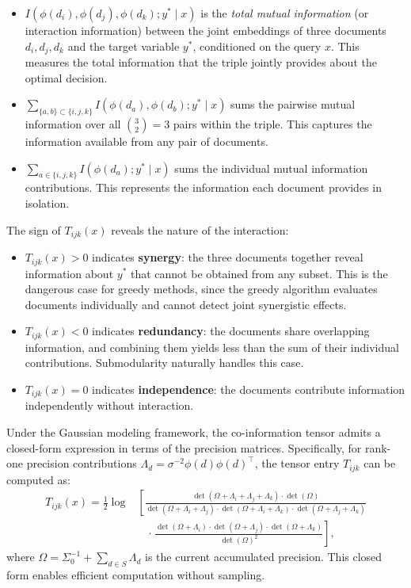 \documentclass[12pt,a4paper,oneside]{report}
\theoremstyle{definition}
\theoremstyle{remark}
\begin{document}
\begin{itemize}[leftmargin=2em]
  \item $I(\phi(d_i), \phi(d_j), \phi(d_k) ; y^* \mid x)$ is the \emph{total mutual information} (or interaction information) between the joint embeddings of three documents $d_i, d_j, d_k$ and the target variable $y^*$, conditioned on the query $x$. This measures the total information that the triple jointly provides about the optimal decision.
  \item $\sum_{\{a,b\} \subset \{i,j,k\}} I(\phi(d_a), \phi(d_b) ; y^* \mid x)$ sums the pairwise mutual information over all $\binom{3}{2} = 3$ pairs within the triple. This captures the information available from any pair of documents.
  \item $\sum_{a \in \{i,j,k\}} I(\phi(d_a) ; y^* \mid x)$ sums the individual mutual information contributions. This represents the information each document provides in isolation.
\end{itemize}

\noindent The sign of $T_{ijk}(x)$ reveals the nature of the interaction:
\begin{itemize}[leftmargin=2em]
  \item $T_{ijk}(x) > 0$ indicates \textbf{synergy}: the three documents together reveal information about $y^*$ that cannot be obtained from any subset. This is the dangerous case for greedy methods, since the greedy algorithm evaluates documents individually and cannot detect joint synergistic effects.
  \item $T_{ijk}(x) < 0$ indicates \textbf{redundancy}: the documents share overlapping information, and combining them yields less than the sum of their individual contributions. Submodularity naturally handles this case.
  \item $T_{ijk}(x) = 0$ indicates \textbf{independence}: the documents contribute information independently without interaction.
\end{itemize}

\noindent Under the Gaussian modeling framework, the co-information tensor admits a closed-form expression in terms of the precision matrices. Specifically, for rank-one precision contributions $\Lambda_d = \sigma^{-2} \phi(d)\phi(d)^\top$, the tensor entry $T_{ijk}$ can be computed as:
\begin{align*}
T_{ijk}(x) = \frac{1}{2}\log &\left[\frac{\det(\Omega + \Lambda_i + \Lambda_j + \Lambda_k) \cdot \det(\Omega)}{\det(\Omega + \Lambda_i + \Lambda_j) \cdot \det(\Omega + \Lambda_i + \Lambda_k) \cdot \det(\Omega + \Lambda_j + \Lambda_k)}\right. \\
&\quad \left.\cdot\; \frac{\det(\Omega + \Lambda_i) \cdot \det(\Omega + \Lambda_j) \cdot \det(\Omega + \Lambda_k)}{\det(\Omega)^2}\right],
\end{align*}
where $\Omega = \Sigma_0^{-1} + \sum_{d \in S} \Lambda_d$ is the current accumulated precision. This closed form enables efficient computation without sampling.
\end{document}
